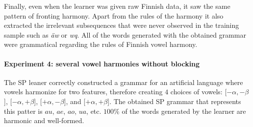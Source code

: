 
Finally, even when the learner was given raw Finnish data, it saw the same pattern of fronting harmony.
Apart from the rules of the harmony it also extracted the irrelevant subsequences that were never observed in the training sample such as \emph{\"aw} or \emph{wq}.
All of the words generated with the obtained grammar were grammatical regarding the rules of Finnish vowel harmony.

\begin{table}[h!]
\centering
{}
\caption{SP learning of a single harmony without blockers; raw representation.}
\end{table}


\paragraph{Experiment 4: several vowel harmonies without blocking}

The SP leaner correctly constructed a grammar for an artificial language where vowels harmonize for two features, therefore creating $4$ choices of vowels: {[}$-\alpha, -\beta${]}, {[}$-\alpha, +\beta${]}, {[}$+\alpha, -\beta${]}, and {[}$+\alpha, +\beta${]}.
The obtained SP grammar that represents this patter is $au$, $ae$, $ao$, $ua$, etc.
$100$\% of the words generated by the learner are harmonic and well-formed.

